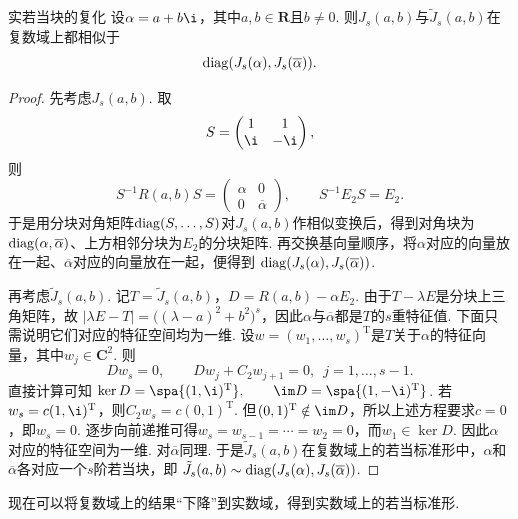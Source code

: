 \begin{lemma}{}{实若当块的复化}
    设$\alpha=a+b\i$，其中$a,b\in\mathbf{R}$且$b\neq 0$. 则$J_s(a,b)$与$\tilde{J}_s(a,b)$在复数域上都相似于
    \[
        \operatorname{diag}(J_s(\alpha),J_s(\overline{\alpha})).
    \]
\end{lemma}
\begin{proof}
    先考虑$J_s(a,b)$. 取
    \[
        S=\begin{pmatrix}
            1 & 1 \\ \i & -\i
        \end{pmatrix},
    \]
    则
    \[
        S^{-1}R(a,b)S=\begin{pmatrix}
            \alpha & 0 \\ 0 & \overline{\alpha}
        \end{pmatrix},\qquad S^{-1}E_2S=E_2.
    \]
    于是用分块对角矩阵$\operatorname{diag}(S,\ldots,S)$对$J_s(a,b)$作相似变换后，得到对角块为$\operatorname{diag}(\alpha,\overline{\alpha})$、上方相邻分块为$E_2$的分块矩阵. 再交换基向量顺序，将$\alpha$对应的向量放在一起、$\overline{\alpha}$对应的向量放在一起，便得到 $\operatorname{diag}(J_s(\alpha),J_s(\overline{\alpha}))$.

    再考虑$\tilde{J}_s(a,b)$. 记$T=\tilde{J}_s(a,b)$，$D=R(a,b)-\alpha E_2$. 由于$T-\lambda E$是分块上三角矩阵，故 $|\lambda E-T|=\bigl((\lambda-a)^2+b^2\bigr)^s$，因此$\alpha$与$\overline{\alpha}$都是$T$的$s$重特征值. 下面只需说明它们对应的特征空间均为一维. 设$w=(w_1,\ldots,w_s)^\mathrm{T}$是$T$关于$\alpha$的特征向量，其中$w_j\in\mathbf{C}^2$. 则
    \[
        Dw_s=0,\qquad Dw_j+C_2w_{j+1}=0,\enspace j=1,\ldots,s-1.
    \]
    直接计算可知 $\ker D=\spa\{(1,\i)^\mathrm{T}\},\qquad \im D=\spa\{(1,-\i)^\mathrm{T}\}$. 若$w_s=c(1,\i)^\mathrm{T}$，则$C_2w_s=c(0,1)^\mathrm{T}$. 但$(0,1)^\mathrm{T}\notin\im D$，所以上述方程要求$c=0$，即$w_s=0$. 逐步向前递推可得$w_s=w_{s-1}=\cdots=w_2=0$，而$w_1\in\ker D$. 因此$\alpha$对应的特征空间为一维. 对$\overline{\alpha}$同理. 于是$\tilde{J}_s(a,b)$在复数域上的若当标准形中，$\alpha$和$\overline{\alpha}$各对应一个$s$阶若当块，即 $\tilde{J}_s(a,b)\sim \operatorname{diag}(J_s(\alpha),J_s(\overline{\alpha}))$.
\end{proof}

现在可以将复数域上的结果``下降''到实数域，得到实数域上的若当标准形.

